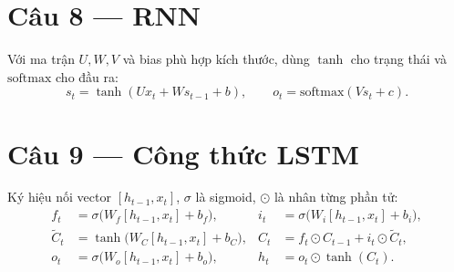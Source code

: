 \section*{Câu 8 --- RNN}
Với ma trận $U,W,V$ và bias phù hợp kích thước, dùng $\tanh$ cho trạng thái và $\mathrm{softmax}$ cho đầu ra:
\[
s_t=\tanh(Ux_t + W s_{t-1} + b),\qquad
o_t=\mathrm{softmax}(V s_t + c).
\]

\section*{Câu 9 --- Công thức LSTM}
Ký hiệu nối vector $[h_{t-1},x_t]$, $\sigma$ là sigmoid, $\odot$ là nhân từng phần tử:
\begin{align*}
f_t &= \sigma\bigl(W_f[h_{t-1},x_t]+b_f\bigr), &
i_t &= \sigma\bigl(W_i[h_{t-1},x_t]+b_i\bigr),\\
\tilde C_t &= \tanh\bigl(W_C[h_{t-1},x_t]+b_C\bigr), &
C_t &= f_t\odot C_{t-1} + i_t\odot \tilde C_t,\\
o_t &= \sigma\bigl(W_o[h_{t-1},x_t]+b_o\bigr), &
h_t &= o_t\odot \tanh(C_t).
\end{align*}

